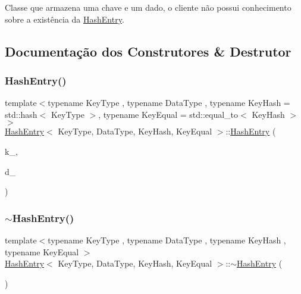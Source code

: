 Classe que armazena uma chave e um dado, o cliente não possui conhecimento sobre a existência da \hyperlink{classHashEntry}{Hash\+Entry}. 

\subsection{Documentação dos Construtores \& Destrutor}
\mbox{\label{classHashEntry_a1247b00f740887cdaeb1c77c2fa05225}} 
\subsubsection{\texorpdfstring{Hash\+Entry()}{HashEntry()}}
{\footnotesize\ttfamily template$<$typename Key\+Type , typename Data\+Type , typename Key\+Hash  = std\+::hash$<$ Key\+Type $>$, typename Key\+Equal  = std\+::equal\+\_\+to$<$ Key\+Hash $>$$>$ \\
\hyperlink{classHashEntry}{Hash\+Entry}$<$ Key\+Type, Data\+Type, Key\+Hash, Key\+Equal $>$\+::\hyperlink{classHashEntry}{Hash\+Entry} (\begin{DoxyParamCaption}\item[{Key\+Type}]{k\+\_\+,  }\item[{Data\+Type}]{d\+\_\+ }\end{DoxyParamCaption})\hspace{0.3cm}{\ttfamily [inline]}}

\mbox{\label{classHashEntry_a68f0323b47cc8c36cbb0c77631b89d5c}} 
\subsubsection{\texorpdfstring{$\sim$\+Hash\+Entry()}{~HashEntry()}}
{\footnotesize\ttfamily template$<$typename Key\+Type , typename Data\+Type , typename Key\+Hash , typename Key\+Equal $>$ \\
\hyperlink{classHashEntry}{Hash\+Entry}$<$ Key\+Type, Data\+Type, Key\+Hash, Key\+Equal $>$\+::$\sim$\hyperlink{classHashEntry}{Hash\+Entry} (\begin{DoxyParamCaption}{ }\end{DoxyParamCaption})\hspace{0.3cm}{\ttfamily [inline]}}



